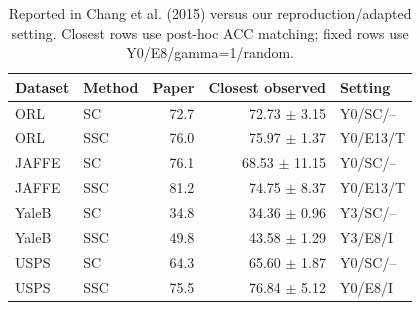 \begin{table}[t]
\centering\small
\caption{Reported in Chang et al. (2015) versus our reproduction/adapted setting. Closest rows use post-hoc ACC matching; fixed rows use Y0/E8/gamma=1/random.}
\label{tab:main}
\begin{tabular}{llrrl}
\toprule Dataset & Method & Paper & Closest observed & Setting \\
\midrule
ORL & SC & 72.7 & 72.73 $\pm$ 3.15 & Y0/SC/-- \\
ORL & SSC & 76.0 & 75.97 $\pm$ 1.37 & Y0/E13/T \\
JAFFE & SC & 76.1 & 68.53 $\pm$ 11.15 & Y0/SC/-- \\
JAFFE & SSC & 81.2 & 74.75 $\pm$ 8.37 & Y0/E13/T \\
YaleB & SC & 34.8 & 34.36 $\pm$ 0.96 & Y3/SC/-- \\
YaleB & SSC & 49.8 & 43.58 $\pm$ 1.29 & Y3/E8/I \\
USPS & SC & 64.3 & 65.60 $\pm$ 1.87 & Y0/SC/-- \\
USPS & SSC & 75.5 & 76.84 $\pm$ 5.12 & Y0/E8/I \\
\bottomrule
\end{tabular}
\end{table}
